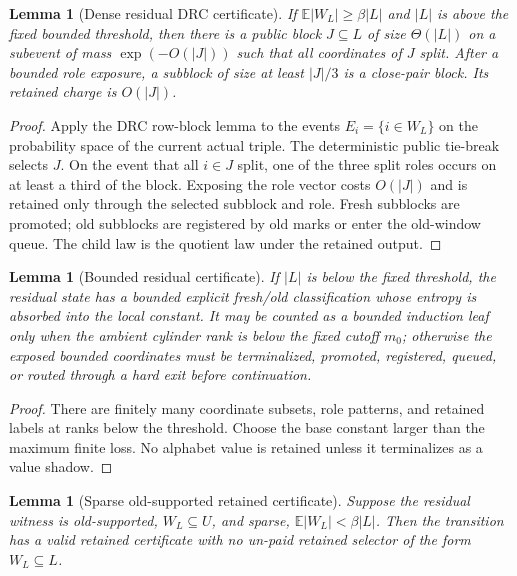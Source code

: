 \documentclass[11pt]{article}
\newtheorem{lemma}[theorem]{Lemma}
\theoremstyle{remark}
\newcommand{\E}{\mathbb E}
\begin{document}
\begin{lemma}[Dense residual DRC certificate]\label{lem:app-dense}
If $\E|W_L|\ge \beta |L|$ and $|L|$ is above the fixed bounded threshold, then there is a public block $J\subseteq L$ of size $\Theta(|L|)$ on a subevent of mass $\exp(-O(|J|))$ such that all coordinates of $J$ split.  After a bounded role exposure, a subblock of size at least $|J|/3$ is a close-pair block.  Its retained charge is $O(|J|)$.
\end{lemma}

\begin{proof}
Apply the DRC row-block lemma to the events $E_i=\{i\in W_L\}$ on the probability space of the current actual triple.  The deterministic public tie-break selects $J$.  On the event that all $i\in J$ split, one of the three split roles occurs on at least a third of the block.  Exposing the role vector costs $O(|J|)$ and is retained only through the selected subblock and role.  Fresh subblocks are promoted; old subblocks are registered by old marks or enter the old-window queue.  The child law is the quotient law under the retained output.
\end{proof}

\begin{lemma}[Bounded residual certificate]\label{lem:app-bounded-residual}
If $|L|$ is below the fixed threshold, the residual state has a bounded explicit
fresh/old classification whose entropy is absorbed into the local constant.  It
may be counted as a bounded induction leaf only when the ambient cylinder rank
is below the fixed cutoff $m_0$; otherwise the exposed bounded coordinates must
be terminalized, promoted, registered, queued, or routed through a hard exit
before continuation.
\end{lemma}

\begin{proof}
There are finitely many coordinate subsets, role patterns, and retained labels at ranks below the threshold.  Choose the base constant larger than the maximum finite loss.  No alphabet value is retained unless it terminalizes as a value shadow.
\end{proof}

\begin{lemma}[Sparse old-supported retained certificate]\label{lem:app-sparse-old}
Suppose the residual witness is old-supported, $W_L\subseteq U$, and sparse, $\E |W_L|<\beta |L|$.  Then the transition has a valid retained certificate with no un-paid retained selector of the form $W_L\subseteq L$.
\end{lemma}
\end{document}
